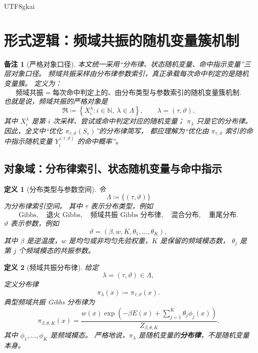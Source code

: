 \documentclass[12pt]{article}
\newtheorem{definition}{定义}[section]
\newtheorem{remark}{备注}[section]
\newcommand{\NN}{\mathbb{N}}
\newcommand{\DefEq}{\coloneqq}
\begin{document}
\begin{CJK*}{UTF8}{gkai}
\clearpage

\section{形式逻辑：频域共振的随机变量簇机制}
\label{sec:tex55-resonance-random-variable-cluster}

\begin{remark}[严格对象口径]
本文统一采用“分布律、状态随机变量、命中指示变量”三层对象口径。
频域共振采样由分布律参数索引，真正承载每次命中判定的是随机变量簇。
定义为：
\[
  \boxed{
  \text{频域共振}
  =
  \text{每次命中判定上的、由分布类型与参数索引的随机变量簇机制}.
  }
\]
也就是说，频域共振的严格对象是
\[
  \boxed{
  \mathfrak R
  \DefEq
  \left\{
  X_i^{\lambda}:i\in\NN,\ \lambda\in\Lambda
  \right\},
  \qquad
  \lambda=(\tau,\vartheta).
  }
\]
其中 \(X_i^\lambda\) 是第 \(i\) 次采样、尝试或命中判定对应的随机变量；
\(\pi_\lambda\) 只是它的分布律。
因此，全文中“优化 \(\pi_{\tau,\vartheta}(S_\varepsilon)\)”的分布律简写，
都应理解为“优化由 \(\pi_{\tau,\vartheta}\) 索引的命中指示随机变量 \(Y_i^{(\tau,\vartheta)}\) 的命中概率”。
\end{remark}

\subsection{对象域：分布律索引、状态随机变量与命中指示}
\label{subsec:tex55-resonance-rv-objects}

\begin{definition}[分布类型与参数空间]
\label{def:tex55-law-index-space}
令
\[
  \Lambda
  \DefEq
  \{(\tau,\vartheta)\}
\]
为分布律索引空间。
其中 \(\tau\) 表示分布类型，例如
\[
  \text{Gibbs},
  \quad
  \text{退火 Gibbs},
  \quad
  \text{频域共振 Gibbs 分布律},
  \quad
  \text{混合分布},
  \quad
  \text{重尾分布}.
\]
\(\vartheta\) 表示参数，例如
\[
  \vartheta=(\beta,w,K,\theta_1,\ldots,\theta_K),
\]
其中 \(\beta\) 是逆温度，\(w\) 是均匀或非均匀先验权重，\(K\) 是保留的频域模态数，
\(\theta_j\) 是第 \(j\) 个频域模态的共振参数。
\end{definition}

\begin{definition}[频域共振分布律]
\label{def:tex55-resonance-law-corrected}
给定
\[
  \lambda=(\tau,\vartheta)\in\Lambda,
\]
定义分布律
\[
  \pi_\lambda(x)\DefEq\pi_{\tau,\vartheta}(x).
\]
典型频域共振 Gibbs 分布律为
\[
  \pi_{\beta,\theta,K}(x)
  =
  \frac{
  w(x)
  \exp\left(
  -\beta E(x)+\sum_{j=1}^{K}\theta_j\phi_j(x)
  \right)
  }{
  Z_{\beta,\theta,K}
  }.
\]
其中 \(\phi_1,\ldots,\phi_K\) 是频域模态。
严格地说，\(\pi_\lambda\) 是随机变量的\textbf{分布律}，不是随机变量本身。
\end{definition}


\end{CJK*}
\end{document}
